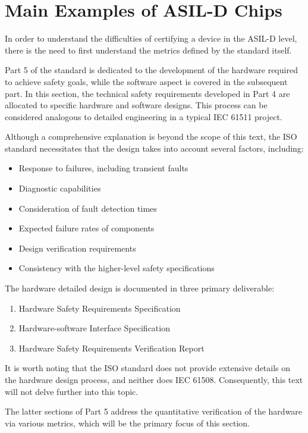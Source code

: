 \documentclass[./dissertation.tex]{subfiles}
\begin{document}
\section{Main Examples of ASIL-D Chips}

In order to understand the difficulties of certifying a device in the ASIL-D level, there is the need to first understand the metrics defined by the standard itself.

Part 5 of the standard is dedicated to the development of the hardware required to achieve safety goals, while the software aspect is covered in the subsequent part. In this section, the technical safety requirements developed in Part 4 are allocated to specific hardware and software designs. This process can be considered analogous to detailed engineering in a typical IEC 61511 project.

Although a comprehensive explanation is beyond the scope of this text, the ISO standard necessitates that the design takes into account several factors, including:

\begin{itemize}
\item Response to failures, including transient faults
\item Diagnostic capabilities
\item Consideration of fault detection times
\item Expected failure rates of components
\item Design verification requirements
\item Consistency with the higher-level safety specifications
\end{itemize}

The hardware detailed design is documented in three primary deliverable:

\begin{enumerate}
\item Hardware Safety Requirements Specification
\item Hardware-software Interface Specification
\item Hardware Safety Requirements Verification Report
\end{enumerate}

It is worth noting that the ISO standard does not provide extensive details on the hardware design process, and neither does IEC 61508. Consequently, this text will not delve further into this topic.

The latter sections of Part 5 address the quantitative verification of the hardware via various metrics, which will be the primary focus of this section.
\end{document}
